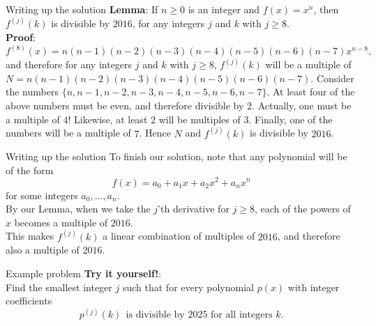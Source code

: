 \documentclass{beamer}
\begin{document}
\begin{frame}{Writing up the solution}
\textbf{Lemma}: If $n\geq 0$ is an integer and $f(x) = x^n$, then $f^{(j)}(k)$ is divisible by $2016$, for any integers $j$ and $k$ with $j\geq 8$.\\
\pause
\textbf{Proof}:\\
\pause
\hfil $f^{(8)}(x) = n(n-1)(n-2)(n-3)(n-4)(n-5)(n-6)(n-7)x^{n-8},$
\pause
and therefore for any integers $j$ and $k$ with $j\geq 8$, $f^{(j)}(k)$ will be a multiple of\\
\hfil $N = n(n-1)(n-2)(n-3)(n-4)(n-5)(n-6)(n-7).$
\pause
Consider the numbers
\hfil $\{n,n-1,n-2,n-3,n-4,n-5,n-6,n-7\}.$
\pause
At least four of the above numbers must be even, and therefore divisible by $2$. 
\pause
Actually, one must be a multiple of $4$!
\pause
Likewise, at least $2$ will be multiples of $3$. 
\pause
Finally, one of the numbers will be a multiple of $7$. 
\pause
Hence $N$ and $f^{(j)}(k)$ is divisible by $2016$.
\end{frame}

\begin{frame}{Writing up the solution}
To finish our solution, note that any polynomial will be of the form
$$f(x) = a_0 + a_1x + a_2x^2 + a_nx^n$$
for some integers $a_0,\dots, a_n$.\\
\pause
By our Lemma, when we take the $j$'th derivative for $j\geq 8$, each of the powers of $x$ becomes a multiple of $2016$.\\
\pause
This makes $f^{(j)}(k)$ a linear combination of multiples of $2016$, and therefore also a multiple of $2016$.
\end{frame}

\begin{frame}{Example problem}
\textbf{Try it yourself!}:\\
Find the smallest integer $j$ such that for every polynomial $p(x)$ with integer coefficients
$$p^{(j)}(k)\ \ \text{is divisible by $2025$ for all integers $k$}.$$
\end{frame}
\end{document}
